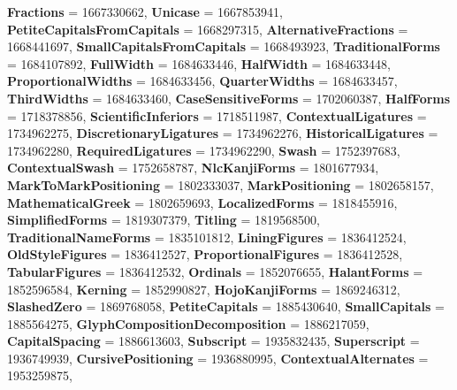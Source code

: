 \begin{DoxyCompactItemize}
\newline
{\bfseries Fractions} = 1667330662, 
{\bfseries Unicase} = 1667853941, 
{\bfseries Petite\+Capitals\+From\+Capitals} = 1668297315, 
{\bfseries Alternative\+Fractions} = 1668441697, 
\newline
{\bfseries Small\+Capitals\+From\+Capitals} = 1668493923, 
{\bfseries Traditional\+Forms} = 1684107892, 
{\bfseries Full\+Width} = 1684633446, 
{\bfseries Half\+Width} = 1684633448, 
\newline
{\bfseries Proportional\+Widths} = 1684633456, 
{\bfseries Quarter\+Widths} = 1684633457, 
{\bfseries Third\+Widths} = 1684633460, 
{\bfseries Case\+Sensitive\+Forms} = 1702060387, 
\newline
{\bfseries Half\+Forms} = 1718378856, 
{\bfseries Scientific\+Inferiors} = 1718511987, 
{\bfseries Contextual\+Ligatures} = 1734962275, 
{\bfseries Discretionary\+Ligatures} = 1734962276, 
\newline
{\bfseries Historical\+Ligatures} = 1734962280, 
{\bfseries Required\+Ligatures} = 1734962290, 
{\bfseries Swash} = 1752397683, 
{\bfseries Contextual\+Swash} = 1752658787, 
\newline
{\bfseries Nlc\+Kanji\+Forms} = 1801677934, 
{\bfseries Mark\+To\+Mark\+Positioning} = 1802333037, 
{\bfseries Mark\+Positioning} = 1802658157, 
{\bfseries Mathematical\+Greek} = 1802659693, 
\newline
{\bfseries Localized\+Forms} = 1818455916, 
{\bfseries Simplified\+Forms} = 1819307379, 
{\bfseries Titling} = 1819568500, 
{\bfseries Traditional\+Name\+Forms} = 1835101812, 
\newline
{\bfseries Lining\+Figures} = 1836412524, 
{\bfseries Old\+Style\+Figures} = 1836412527, 
{\bfseries Proportional\+Figures} = 1836412528, 
{\bfseries Tabular\+Figures} = 1836412532, 
\newline
{\bfseries Ordinals} = 1852076655, 
{\bfseries Halant\+Forms} = 1852596584, 
{\bfseries Kerning} = 1852990827, 
{\bfseries Hojo\+Kanji\+Forms} = 1869246312, 
\newline
{\bfseries Slashed\+Zero} = 1869768058, 
{\bfseries Petite\+Capitals} = 1885430640, 
{\bfseries Small\+Capitals} = 1885564275, 
{\bfseries Glyph\+Composition\+Decomposition} = 1886217059, 
\newline
{\bfseries Capital\+Spacing} = 1886613603, 
{\bfseries Subscript} = 1935832435, 
{\bfseries Superscript} = 1936749939, 
{\bfseries Cursive\+Positioning} = 1936880995, 
\newline
{\bfseries Contextual\+Alternates} = 1953259875, 

\end{DoxyCompactItemize}
